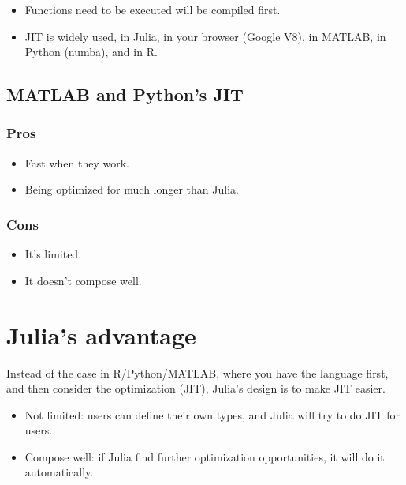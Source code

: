\documentclass[11pt]{article}
\providecommand{\tightlist}{%
      \setlength{\itemsep}{0pt}\setlength{\parskip}{0pt}}
\begin{document}
\begin{itemize}
\item
  Functions need to be executed will be compiled first.
\item
  JIT is widely used, in Julia, in your browser (Google V8), in MATLAB,
  in Python (numba), and in R.
\end{itemize}

\hypertarget{matlab-and-pythons-jit}{%
\subsection{MATLAB and Python's JIT}\label{matlab-and-pythons-jit}}

\hypertarget{pros}{%
\subsubsection{Pros}\label{pros}}

\begin{itemize}
\tightlist
\item
  Fast when they work.
\item
  Being optimized for much longer than Julia.
\end{itemize}

\hypertarget{cons}{%
\subsubsection{Cons}\label{cons}}

\begin{itemize}
\tightlist
\item
  It's limited.
\item
  It doesn't compose well.
\end{itemize}

    \hypertarget{julias-advantage}{%
\section{Julia's advantage}\label{julias-advantage}}

Instead of the case in R/Python/MATLAB, where you have the language
first, and then consider the optimization (JIT), Julia's design is to
make JIT easier.

\begin{itemize}
\item
  Not limited: users can define their own types, and Julia will try to
  do JIT for users.
\item
  Compose well: if Julia find further optimization opportunities, it
  will do it automatically.
\end{itemize}
\end{document}
